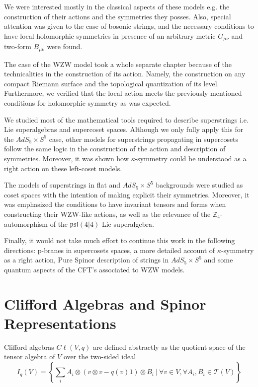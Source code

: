 \documentclass[a4paper,12pt]{article}
\numberwithin{equation}{section}
\numberwithin{thm}{section}
\numberwithin{exm}{section}
\newcommand{\cl}{C\ell}
\newcommand{\Z}{{\mathbb Z}}
\newcommand{\ads}{{AdS_5\times S^5}}
\newcommand{\<}{{\langle}}
\renewcommand{\>}{{\rangle}}
\newcommand{\mf}{\mathfrak}
\renewcommand{\k}{{\kappa}}
\newcommand{\m}{{\mu}}
\newcommand{\n}{{\nu}}
\begin{document}
We were interested mostly in the classical aspects of these models e.g. the construction of their actions and the symmetries they posses. Also, special attention was given to the case of bosonic strings, and the necessary conditions to have local holomorphic symmetries in presence of an arbitrary metric $G_{\m\n}$ and two-form $B_{\m\n}$ were found.

The case of the WZW model took a whole separate chapter because of the technicalities in the construction of its action. Namely, the construction on any compact Riemann surface and the topological quantization of its level. Furthermore, we verified that the local action meets the previously mentioned conditions for holomorphic symmetry as was expected.

We studied most of the mathematical tools required to describe superstrings i.e. Lie superalgebras and supercoset spaces. Although we only fully apply this for the $\ads$ case, other models for superstrings propagating in supercosets follow the same logic in the construction of the action and description of symmetries. Moreover, it was shown how $\k$-symmetry could be understood as a right action on these left-coset models.

The models of superstrings in flat and $\ads$ backgrounds were studied as coset spaces with the intention of making explicit their symmetries. Moreover, it was emphasized the conditions to have invariant tensors and forms when constructing their WZW-like actions, as well as the relevance of the $\Z_4$-automorphism of the $\mf{psl}(4|4)$ Lie superalgebra.

Finally, it would not take much effort to continue this work in the following directions: p-branes in supercosets spaces, a more detailed account of $\k$-symmetry as a right action, Pure Spinor description of strings in $\ads$ and some quantum aspects of the CFT's associated to WZW models.


\newpage


\appendix

\section{Clifford Algebras and Spinor Representations}
Clifford algebras $\cl(V,q)$ are defined abstractly as the quotient space of the tensor algebra of $V$ over the two-sided ideal
	\begin{equation}
	I_q(V)=\left\{ \sum_i A_i\otimes(v\otimes v-q(v)1)\otimes B_i\ \Big|\ \forall v\in V, \forall A_i,B_i\in\mathcal{T}(V) \right\}
	\end{equation}
\end{document}
